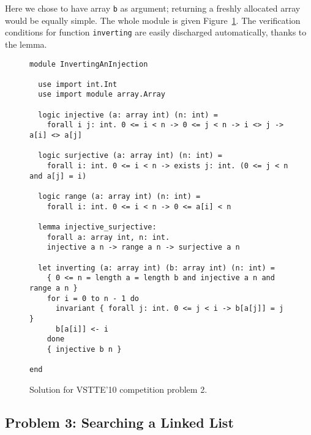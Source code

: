 Here we chose to have array \texttt{b} as argument; returning a
freshly allocated array would be equally simple.
The whole module is given Figure~\ref{fig:Inverting}.
The verification conditions for function \texttt{inverting} are easily
discharged automatically, thanks to the lemma.
\begin{figure}
  \centering
\begin{verbatim}
module InvertingAnInjection

  use import int.Int
  use import module array.Array

  logic injective (a: array int) (n: int) =
    forall i j: int. 0 <= i < n -> 0 <= j < n -> i <> j -> a[i] <> a[j]

  logic surjective (a: array int) (n: int) =
    forall i: int. 0 <= i < n -> exists j: int. (0 <= j < n and a[j] = i)

  logic range (a: array int) (n: int) =
    forall i: int. 0 <= i < n -> 0 <= a[i] < n

  lemma injective_surjective:
    forall a: array int, n: int.
    injective a n -> range a n -> surjective a n

  let inverting (a: array int) (b: array int) (n: int) =
    { 0 <= n = length a = length b and injective a n and range a n }
    for i = 0 to n - 1 do
      invariant { forall j: int. 0 <= j < i -> b[a[j]] = j }
      b[a[i]] <- i
    done
    { injective b n }

end
\end{verbatim}
\vspace*{-2em}\hrulefill
  \caption{Solution for VSTTE'10 competition problem 2.}
  \label{fig:Inverting}
\end{figure}

\subsection{Problem 3: Searching a Linked List}

